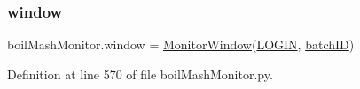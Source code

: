 \mbox{\label{namespaceboil_mash_monitor_a153037ae99a581f857b26b7ea6a9d53e}} 
\subsubsection{\texorpdfstring{window}{window}}
{\footnotesize\ttfamily boil\+Mash\+Monitor.\+window = \mbox{\hyperlink{classboil_mash_monitor_1_1_monitor_window}{Monitor\+Window}}(\mbox{\hyperlink{namespaceboil_mash_monitor_a8408c26ef74bdfc75af04aba577b439d}{L\+O\+G\+IN}}, \mbox{\hyperlink{namespaceboil_mash_monitor_a92c0da44566d11f8b05a97da7dd7c72d}{batch\+ID}})}



Definition at line 570 of file boil\+Mash\+Monitor.\+py.


